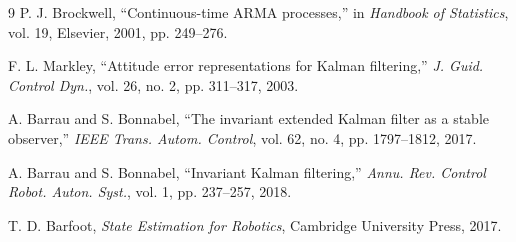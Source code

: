 \documentclass[conference]{IEEEtran}
\theoremstyle{bodysmall}
\begin{document}
\begin{thebibliography}{9}
P. J. Brockwell, ``Continuous-time ARMA processes,'' in \emph{Handbook of
Statistics}, vol. 19, Elsevier, 2001, pp. 249--276.

F. L. Markley, ``Attitude error representations for Kalman filtering,''
\emph{J. Guid. Control Dyn.}, vol. 26, no. 2, pp. 311--317, 2003.

A. Barrau and S. Bonnabel, ``The invariant extended Kalman filter as a stable
observer,'' \emph{IEEE Trans. Autom. Control}, vol. 62, no. 4,
pp. 1797--1812, 2017.

A. Barrau and S. Bonnabel, ``Invariant Kalman filtering,'' \emph{Annu. Rev.
Control Robot. Auton. Syst.}, vol. 1, pp. 237--257, 2018.

T. D. Barfoot, \emph{State Estimation for Robotics}, Cambridge University
Press, 2017.
\end{thebibliography}
\end{document}
